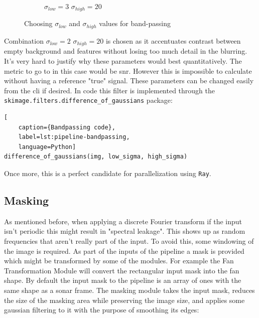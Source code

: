 \begin{figure}[H]
\begin{subfigure}[b]{.32\textwidth}
        \caption{\(\sigma_{low} = 3\) \(\sigma_{high} = 20\)}
    \end{subfigure}
    \caption{Choosing \(\sigma_{low}\) and \(\sigma_{high}\) values for band-passing}
    \label{fig:resizing}
\end{figure}

Combination \(\sigma_{low} = 2\) \(\sigma_{high} = 20\) is chosen as it accentuates contrast between empty background and features without losing too much detail in the blurring. It's very hard to justify why these parameters would best quantitatively. The metric to go to in this case would be \acrfull{snr}. However this is impossible to calculate without having a reference "true" signal. These parameters can be changed easily from the \acrshort{cli} if desired. In code this filter is implemented through the \texttt{skimage.filters.difference\_of\_gaussians} package:

\begin{lstlisting}[
    caption={Bandpassing code},
    label=lst:pipeline-bandpassing,
    language=Python]
difference_of_gaussians(img, low_sigma, high_sigma)
\end{lstlisting}

Once more, this is a perfect candidate for parallelization using \texttt{Ray}.

\subsection{Masking}

As mentioned before, when applying a discrete Fourier transform if the input isn't periodic this might result in "spectral leakage". This shows up as random frequencies that aren't really part of the input. To avoid this, some windowing of the image is required. As part of the inputs of the pipeline a mask is provided which might be transformed by some of the modules. For example the Fan Transformation Module will convert the rectangular input mask into the fan shape. By default the input mask to the pipeline is an array of ones with the same shape as a sonar frame. The masking module takes the input mask, reduces the size of the masking area while preserving the image size, and applies some gaussian filtering to it with the purpose of smoothing its edges:

